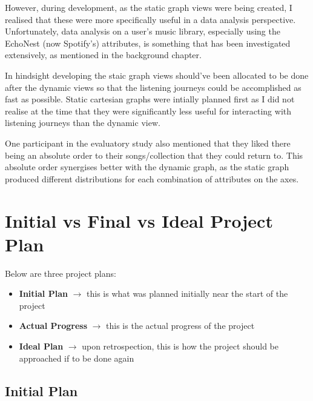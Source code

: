 However, during development, as the static graph views were being created, I realised that these were more specifically useful in a data analysis perspective. Unfortunately, data analysis on a user's music library, especially using the EchoNest (now Spotify's) attributes, is something that has been investigated extensively, as mentioned in the background chapter.

In hindsight developing the staic graph views should've been allocated to be done after the dynamic views so that the listening journeys could be accomplished as fast as possible. Static cartesian graphs were intially planned first as I did not realise at the time that they were significantly less useful for interacting with listening journeys than the dynamic view.

One participant in the evaluatory study also mentioned that they liked there being an absolute order to their songs/collection that they could return to. This absolute order synergises better with the dynamic graph, as the static graph produced different distributions for each combination of attributes on the axes.

\section{Initial vs Final vs Ideal Project Plan} %
Below are three project plans:\begin{itemize}
    \item \textbf{Initial Plan} \(\to\) this is what was planned initially near the start of the project
    \item \textbf{Actual Progress} \(\to\) this is the actual progress of the project
    \item \textbf{Ideal Plan} \(\to\) upon retrospection, this is how the project should be approached if to be done again
\end{itemize}

\subsection{Initial Plan}

